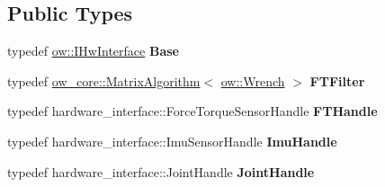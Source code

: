\subsection*{Public Types}
\begin{DoxyCompactItemize}
\item 
typedef \hyperlink{classow_1_1IHwInterface}{ow\+::\+I\+Hw\+Interface} {\bfseries Base}\hypertarget{classow__hw__interface_1_1Robot_a0adec415688b6c374c19a9423fa50511}{}\label{classow__hw__interface_1_1Robot_a0adec415688b6c374c19a9423fa50511}

\item 
typedef \hyperlink{classow__core_1_1MatrixAlgorithm}{ow\+\_\+core\+::\+Matrix\+Algorithm}$<$ \hyperlink{classow__core_1_1Wrench}{ow\+::\+Wrench} $>$ {\bfseries F\+T\+Filter}\hypertarget{classow__hw__interface_1_1Robot_a3816b75d4ecb066835bb470da5746f52}{}\label{classow__hw__interface_1_1Robot_a3816b75d4ecb066835bb470da5746f52}

\item 
typedef hardware\+\_\+interface\+::\+Force\+Torque\+Sensor\+Handle {\bfseries F\+T\+Handle}\hypertarget{classow__hw__interface_1_1Robot_a653e1fe9048904640644d66c913cbb1e}{}\label{classow__hw__interface_1_1Robot_a653e1fe9048904640644d66c913cbb1e}

\item 
typedef hardware\+\_\+interface\+::\+Imu\+Sensor\+Handle {\bfseries Imu\+Handle}\hypertarget{classow__hw__interface_1_1Robot_a70265d711a34b16765bb24ee3dc66f0d}{}\label{classow__hw__interface_1_1Robot_a70265d711a34b16765bb24ee3dc66f0d}

\item 
typedef hardware\+\_\+interface\+::\+Joint\+Handle {\bfseries Joint\+Handle}\hypertarget{classow__hw__interface_1_1Robot_aef2b9e25f9755ab4c7737b906ab1a26c}{}\label{classow__hw__interface_1_1Robot_aef2b9e25f9755ab4c7737b906ab1a26c}

\end{DoxyCompactItemize}
